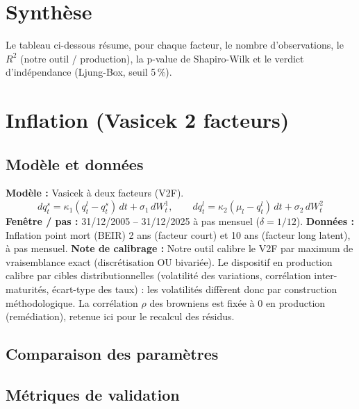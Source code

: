 \documentclass[11pt,a4paper]{article}
\newcommand{\tabcaption}[1]{\par\vspace{2pt}{\centering\footnotesize\textcolor{nexgrey}{\itshape #1}\par}\vspace{8pt}}
\begin{document}
\clearpage
\section{Synth\`ese}
Le tableau ci-dessous r\'esume, pour chaque facteur, le nombre d'observations,
le $R^2$ (notre outil / production), la p-value de Shapiro-Wilk et le verdict
d'ind\'ependance (Ljung-Box, seuil 5\,\%).

\tabcaption{Synth\`ese du benchmark de calibrage (notre outil vs production 2026).}
\clearpage

\section{Inflation (Vasicek 2 facteurs)}
\subsection{Mod\`ele et donn\'ees}
\textbf{Mod\`ele :} Vasicek à deux facteurs (V2F).
\begin{equation*}
dq^s_t=\kappa_1(q^l_t-q^s_t)\,dt+\sigma_1\,dW^1_t,\qquad dq^l_t=\kappa_2(\mu_l-q^l_t)\,dt+\sigma_2\,dW^2_t
\end{equation*}
\textbf{Fen\^etre / pas :} 31/12/2005 -- 31/12/2025 \`a pas mensuel ($\delta=1/12$).
\textbf{Donn\'ees :} Inflation point mort (BEIR) 2 ans (facteur court) et 10 ans (facteur long latent), à pas mensuel.
\textbf{Note de calibrage :} Notre outil calibre le V2F par maximum de vraisemblance exact (discrétisation OU bivariée). Le dispositif en production calibre par cibles distributionnelles (volatilité des variations, corrélation inter-maturités, écart-type des taux) : les volatilités diffèrent donc par construction méthodologique. La corrélation $\rho$ des browniens est fixée à 0 en production (remédiation), retenue ici pour le recalcul des résidus.
\subsection{Comparaison des param\`etres}

\tabcaption{Param\`etres calibr\'es : notre outil vs production 2026 --- Inflation (Vasicek 2 facteurs).}
\subsection{M\'etriques de validation}

\tabcaption{M\'etriques de validation des r\'esidus --- Inflation (Vasicek 2 facteurs).}
\end{document}
